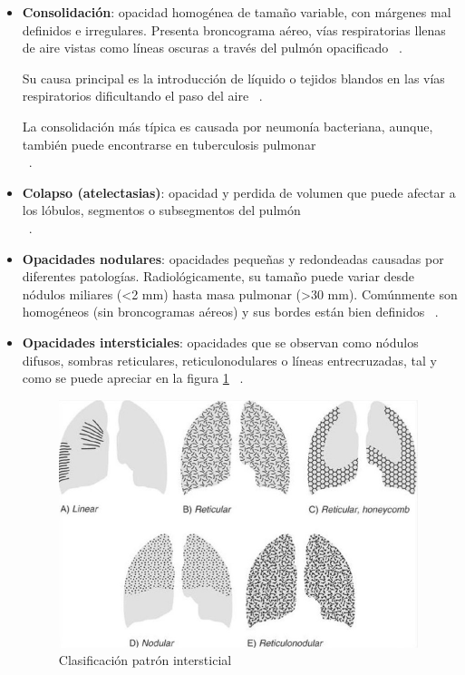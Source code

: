 \begin{itemize}
    \item \textbf{Consolidación}: opacidad homogénea de tamaño variable, con márgenes mal definidos e irregulares. Presenta broncograma aéreo, vías respiratorias llenas de aire vistas como líneas oscuras a través del pulmón opacificado ~\cite{gelaw15}.
    
    Su causa principal es la introducción de líquido o tejidos blandos en las vías respiratorios dificultando el paso del aire ~\cite{gelaw15}.
    
    La consolidación más típica es causada por neumonía bacteriana, aunque, también puede encontrarse en tuberculosis pulmonar\\ ~\cite{gelaw15}.
    
    \item \textbf{Colapso (atelectasias)}: opacidad y perdida de volumen que  puede afectar a los lóbulos, segmentos o subsegmentos del pulmón\\ ~\cite{gelaw15}.

    \item \textbf{Opacidades nodulares}: opacidades pequeñas y redondeadas causadas por diferentes patologías. Radiológicamente, su tamaño puede variar desde nódulos miliares (<2 mm) hasta masa pulmonar (>30 mm). Comúnmente son homogéneos (sin broncogramas aéreos) y sus bordes están bien definidos ~\cite{gelaw15, RadiopaediaPulmNodule24}.

    \item \textbf{Opacidades intersticiales}: opacidades que se observan como nódulos difusos,  sombras reticulares, reticulonodulares o líneas entrecruzadas, tal y como se puede apreciar en la figura \ref{fig:patrones_intersticial}  ~\cite{gelaw15}.

    \begin{figure}[h]
        \centering
        \includegraphics[width=0.99\textwidth]{img/patrones_intersticial.jpg}
        \caption{Clasificación patrón intersticial ~\cite{SlidePlayer24}}
        \label{fig:patrones_intersticial}
    \end{figure}
    \FloatBarrier
    

\end{itemize}
